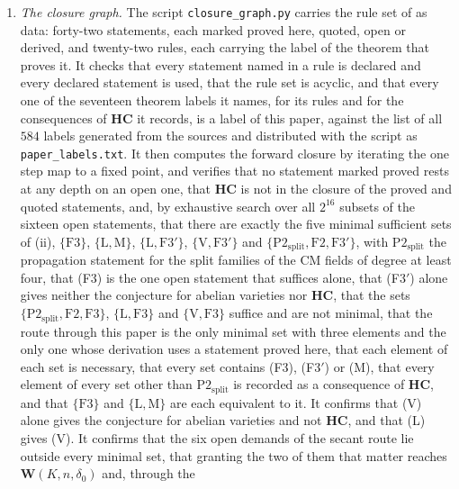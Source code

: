 \begin{enumerate}[label=\textup{(\Roman*)},leftmargin=*]
\item \emph{The closure graph.} The script \texttt{closure\_\allowbreak graph.py}
  carries the rule set of  as data: forty-two statements,
  each marked proved here, quoted, open or derived, and twenty-two rules, each carrying
  the label of the theorem that proves it. It checks that every statement
  named in a rule is declared and every declared statement is used, that the
  rule set is acyclic, and that every one of the seventeen theorem labels it
  names, for its rules and for the consequences of $\mathbf{HC}$ it records,
  is a label of this paper, against the list of all $584$ labels generated
  from the sources and distributed with the script as
  \texttt{paper\_\allowbreak labels.txt}. It then computes the forward closure
  by iterating the one step map to a fixed point, and verifies that no
  statement marked proved rests at any depth on an open one, that
  $\mathbf{HC}$ is not in the closure of the proved and quoted statements,
  and, by exhaustive search over all $2^{16}$ subsets of the sixteen open
  statements, that there are exactly the five minimal sufficient sets of
  (ii), $\{\mathrm{F3}\}$, $\{\mathrm{L},\mathrm{M}\}$,
  $\{\mathrm{L},\mathrm{F3}'\}$, $\{\mathrm{V},\mathrm{F3}'\}$ and
  $\{\mathrm{P2}_{\mathrm{split}},\mathrm{F2},\mathrm{F3}'\}$, with
  $\mathrm{P2}_{\mathrm{split}}$ the propagation statement for the split
  families of the CM fields of degree at least four, that (F3) is the one open
  statement that suffices alone, that \textup{(F3$'$)} alone gives neither
  the conjecture for abelian varieties nor $\mathbf{HC}$, that the sets
  $\{\mathrm{P2}_{\mathrm{split}},\mathrm{F2},\mathrm{F3}\}$, $\{\mathrm{L},\mathrm{F3}\}$
  and $\{\mathrm{V},\mathrm{F3}\}$ suffice and are not minimal, that the
  route through this paper is the only minimal set with three elements and
  the only one whose derivation uses a statement proved here, that each
  element of each set is necessary, that every set contains (F3),
  \textup{(F3$'$)} or \textup{(M)}, that every element of every set other
  than $\mathrm{P2}_{\mathrm{split}}$ is recorded as a consequence of $\mathbf{HC}$, and that
  $\{\mathrm{F3}\}$ and $\{\mathrm{L},\mathrm{M}\}$ are each equivalent
  to it. It confirms that \textup{(V)} alone gives the
  conjecture for abelian varieties and not $\mathbf{HC}$, and that
  \textup{(L)} gives \textup{(V)}. It confirms that the six open demands of
  the secant route lie outside every minimal set, that granting the two of
  them that matter reaches $\mathbf{W}(K,n,\delta_{0})$ and, through the

\end{enumerate}
